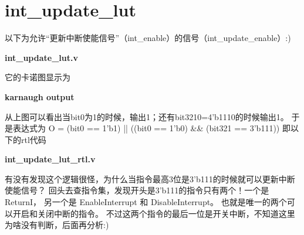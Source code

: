 \section{int\_update\_lut}

以下为允许“更新中断使能信号”（int\_enable）的信号（int\_update\_enable）:)

\textbf{int\_update\_lut.v}


它的卡诺图显示为

\textbf{karnaugh output}


从上图可以看出当bit0为1的时候，输出1；还有bit3210=4'b1110的时候输出1。
于是表达式为 O = (bit0 == 1'b1) || ((bit0 == 1'b0) \&\& (bit321 == 3'b111))
即以下的rtl代码

\textbf{int\_update\_lut\_rtl.v}


有没有发现这个逻辑很怪，为什么当指令最高3位是3'b111的时候就可以更新中断使能信号？
回头去查指令集，发现开头是3'b111的指令只有两个！一个是ReturnI，
另一个是 EnableInterrupt 和 DisableInterrupt。
也就是唯一的两个可以开启和关闭中断的指令。
不过这两个指令的最后一位是开关中断，不知道这里为啥没有判断，后面再分析:)

